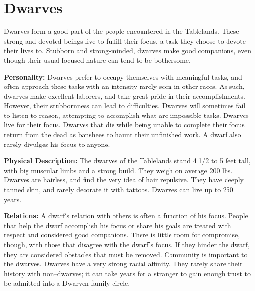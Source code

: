 \documentclass[10pt,a4paper,twocolumn]{d20}
\begin{document}
\section{Dwarves}


Dwarves form a good part of the people encountered in the Tablelands. These strong and devoted beings live to fulfill their focus, a task they choose to devote their lives to. Stubborn and strong‐minded, dwarves make good companions, even though their usual focused nature can tend to be bothersome.

\textbf{Personality:} Dwarves prefer to occupy themselves with meaningful tasks, and often approach these tasks with an intensity rarely seen in other races. As such, dwarves make excellent laborers, and take great pride in their accomplishments. However, their stubbornness can lead to difficulties. Dwarves will sometimes fail to listen to reason, attempting to accomplish what are impossible tasks. Dwarves live for their focus. Dwarves that die while being unable to complete their focus return from the dead as banshees to haunt their unfinished work. A dwarf also rarely divulges his focus to anyone.

\textbf{Physical Description:} The dwarves of the Tablelands stand 4 1/2 to 5 feet tall, with big muscular limbs and a strong build. They weigh on average 200 lbs. Dwarves are hairless, and find the very idea of hair repulsive. They have deeply tanned skin, and rarely decorate it with tattoos. Dwarves can live up to 250 years.

\textbf{Relations:} A dwarfʹs relation with others is often a function of his focus. People that help the dwarf accomplish his focus or share his goals are treated with respect and considered good companions. There is little room for compromise, though, with those that disagree with the dwarf’s focus. If they hinder the dwarf, they are considered obstacles that must be removed. Community is important to the dwarves. Dwarves have a very strong racial affinity. They rarely share their history with non–dwarves; it can take years for a stranger to gain enough trust to be admitted into a Dwarven family circle.
\end{document}

